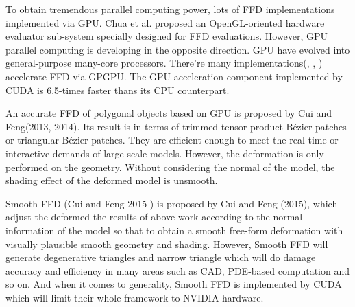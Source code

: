 \documentclass[3p]{elsarticle}
\begin{document}

To obtain tremendous parallel computing power, lots of FFD implementations implemented via GPU. Chua et al. \cite{Chua00} proposed an OpenGL-oriented hardware evaluator sub-system specially designed for FFD evaluations. However, GPU parallel computing is developing in the opposite direction. GPU have evolved into general-purpose many-core processors. There're many implementations(\cite{Schein06}, \cite{Jung11}, \cite{Hahmann12}) accelerate FFD via GPGPU. The GPU acceleration component implemented by CUDA is 6.5-times faster thans its CPU counterpart.


An accurate FFD of polygonal objects based on GPU is proposed by Cui and Feng(2013, 2014).
Its result is in terms of trimmed tensor product Bézier patches or triangular Bézier patches.
They are efficient enough to meet the real-time or interactive demands of large-scale models.
However, the deformation is only performed on the geometry.
Without considering the normal of the model, the shading effect of the deformed model is unsmooth.

Smooth FFD (Cui and Feng 2015 ) is proposed by Cui and Feng (2015), which adjust the deformed the results of above work according to the normal information of the model so that to obtain a smooth free-form deformation with visually plausible smooth geometry and shading. However, Smooth FFD will generate degenerative triangles and narrow triangle which will do damage accuracy and efficiency in many areas such as CAD, PDE-based computation and so on. And when it comes to generality, Smooth FFD is implemented by CUDA which will limit their whole framework to NVIDIA hardware.
\end{document}

